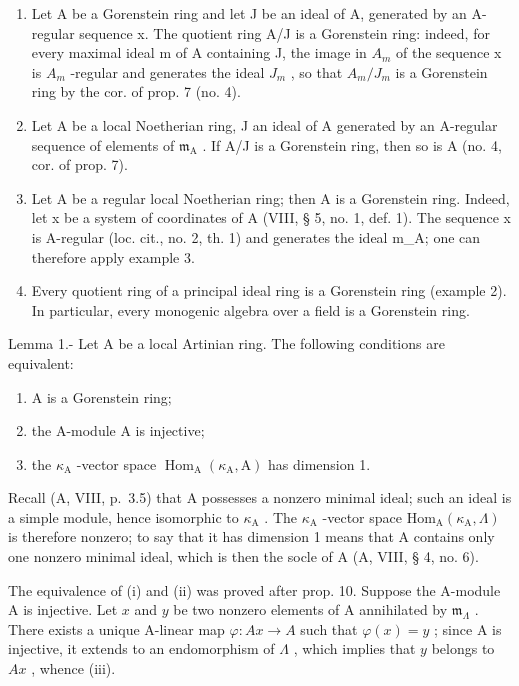 \begin{enumerate}
\def\labelenumi{\arabic{enumi})}
\setcounter{enumi}{1}
\item
  Let A be a Gorenstein ring and let J be an ideal of A, generated by an A-regular sequence x. The quotient ring A/J is a Gorenstein ring: indeed, for every maximal ideal m of A containing J, the image in \(A_{m}\) of the sequence x is \(A_{m}\) -regular and generates the ideal \(J_{m}\) , so that \(A_{m}/J_{m}\) is a Gorenstein ring by the cor. of prop. 7 (no. 4).
\item
  Let A be a local Noetherian ring, J an ideal of A generated by an A-regular sequence of elements of \(\mathfrak{m}_{\mathrm{A}}\) . If A/J is a Gorenstein ring, then so is A (no. 4, cor. of prop. 7).
\item
  Let A be a regular local Noetherian ring; then A is a Gorenstein ring. Indeed, let x be a system of coordinates of A (VIII, § 5, no. 1, def. 1). The sequence x is A-regular (loc. cit., no. 2, th. 1) and generates the ideal m\_A; one can therefore apply example 3.
\item
  Every quotient ring of a principal ideal ring is a Gorenstein ring (example 2). In particular, every monogenic algebra over a field is a Gorenstein ring.
\end{enumerate}

Lemma 1.- Let A be a local Artinian ring. The following conditions are equivalent:

\begin{enumerate}
\def\labelenumi{(\roman{enumi})}
\item
  A is a Gorenstein ring;
\item
  the A-module A is injective;
\item
  the \(\kappa_{\mathrm{A}}\) -vector space \(\operatorname{Hom}_{\mathrm{A}}(\kappa_{\mathrm{A}}, \mathrm{A})\) has dimension 1.
\end{enumerate}

Recall (A, VIII, p.~3.5) that A possesses a nonzero minimal ideal; such an ideal is a simple module, hence isomorphic to \(\kappa_{\mathrm{A}}\) . The \(\kappa_{\mathrm{A}}\) -vector space \(\mathrm{Hom}_{\mathrm{A}}(\kappa_{\mathrm{A}}, \Lambda)\) is therefore nonzero; to say that it has dimension 1 means that A contains only one nonzero minimal ideal, which is then the socle of A (A, VIII, § 4, no. 6).

The equivalence of (i) and (ii) was proved after prop. 10. Suppose the A-module A is injective. Let \(x\) and \(y\) be two nonzero elements of A annihilated by \(\mathfrak{m}_{\Lambda}\) . There exists a unique A-linear map \(\varphi : Ax \to A\) such that \(\varphi(x) = y\) ; since A is injective, it extends to an endomorphism of \(\Lambda\) , which implies that \(y\) belongs to \(Ax\) , whence (iii).

